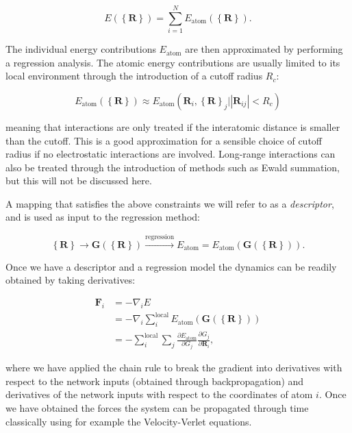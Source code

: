 \begin{equation}
 E(\left\{\bm{R}\right\}) = \sum_{i=1}^N E_{\text{atom}}
 (\left\{\bm{R}\right\}) . 
\end{equation}

The individual energy contributions $E_{\text{atom}}$
are then approximated by performing a regression analysis.
The atomic energy contributions are usually limited to its
local environment through the introduction of a cutoff radius $R_c$:

\begin{equation}
 E_{\text{atom}} (\left\{\bm{R}\right\}) \approx
    E_{\text{atom}} (\bm{R}_i, \left\{\bm{R}\right\}_j 
    | \left| \bm{R}_{ij} \right|
    < R_c) 
\end{equation}

meaning that interactions are only treated if the interatomic distance
is smaller than the cutoff. This is a good approximation for a sensible
choice of cutoff radius if no electrostatic interactions are involved.
Long-range interactions can also be treated through
the introduction of methods such as Ewald summation, but this will
not be discussed here.
\par
A mapping that satisfies the above constraints we will refer to
as a \textit{descriptor}, and is used as input to the regression method:

\begin{equation}
    \left\{\bm{R}\right\} \rightarrow \bm{G}(\left\{\bm{R}\right\}) 
    \overset{\text{regression}}
    {\longrightarrow} E_{\text{atom}} =
    E_{\text{atom}}(\bm{G}(\left\{\bm{R}\right\})). 
\end{equation}

Once we have a descriptor and a regression model the dynamics
can be readily obtained by taking derivatives:

\begin{equation}
\begin{split}
    \bm{F}_i &= -\nabla_i E \\
    &= -\nabla_i \sum_i^{\text{local}}
    E_{\text{atom}}(\bm{G}(\left\{\bm{R}\right\})) \\
    &= -\sum_i^{\text{local}} \sum_j \frac{\partial E_{\text{atom}}}
    {\partial G_j} \frac{\partial G_j}{\partial \bm{R}_i} ,
\end{split}
\end{equation}

where we have applied the chain rule to break the gradient
into derivatives with respect to the network inputs (obtained through
backpropagation) and derivatives of the network inputs with
respect to the coordinates of atom $i$.
Once we have obtained the forces the system can be propagated through time
classically using for example the Velocity-Verlet equations.

